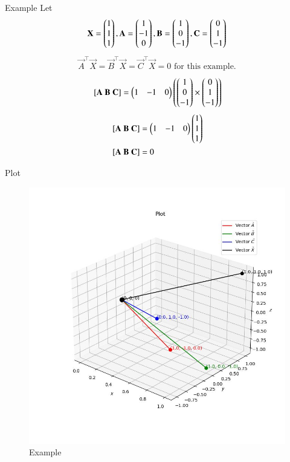\documentclass{beamer}
\begin{document}
\begin{frame}{Example}
Let
\begin{align*}
    \mathbf{X}=\begin{pmatrix}1 \\ 1 \\ 1\end{pmatrix}, \mathbf{A}=\begin{pmatrix}1 \\ -1 \\ 0\end{pmatrix}, \mathbf{B}=\begin{pmatrix}1 \\ 0 \\ -1\end{pmatrix}, \mathbf{C}=\begin{pmatrix}0 \\ 1 \\ -1\end{pmatrix}
\end{align*}
\begin{align}
    \vec{A}^\top \vec{X} = \vec{B}^\top \vec{X} = \vec{C}^\top \vec{X} = 0\text{ for this example.}
\end{align}
\begin{align}
    {}\left[\mathbf{A}\ \mathbf{B}\ \mathbf{C}\right] = \begin{pmatrix}1 & -1 & 0\end{pmatrix}\left(\begin{pmatrix}1 \\ 0 \\ -1\end{pmatrix}\times\begin{pmatrix}0 \\ 1 \\ -1\end{pmatrix}\right)
\end{align}
\begin{align}
    {}\left[\mathbf{A}\ \mathbf{B}\ \mathbf{C}\right] &= \begin{pmatrix}1 & -1 & 0\end{pmatrix} \begin{pmatrix}1 \\ 1 \\ 1\end{pmatrix} \\
    {}\left[\mathbf{A}\ \mathbf{B}\ \mathbf{C}\right] &= 0
\end{align}
\end{frame}

\begin{frame}{Plot}
    \begin{figure}
        \centering
        \includegraphics[width=0.5\columnwidth]{../figs/plot_c.jpg}
        \caption{Example}
        \label{fig:fig}
    \end{figure}
\end{frame}
\end{document}
